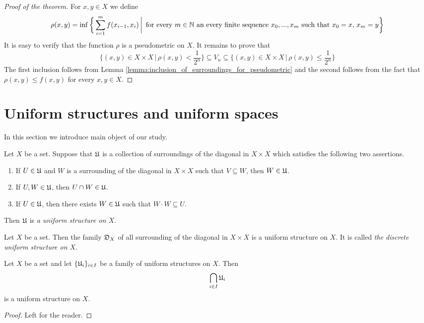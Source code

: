 \begin{proof}[Proof of the theorem]
For $x,y\in X$ we define
$$\rho(x,y) = \inf \bigg\{\sum_{i=1}^mf(x_{i-1},x_i)\,\bigg|\,\mbox{ for every }m\in {\mathbb N}\mbox{ an every finite sequence }x_0,...,x_m\mbox{ such that }x_0 = x,\,x_m = y\bigg\}$$
It is easy to verify that the function $\rho$ is a pseudometric on $X$. It remains to prove that
$$\bigg\{(x,y)\in X\times X\,\bigg|\,\rho(x,y)<\frac{1}{2^n}\bigg\} \subseteq V_n \subseteq \bigg\{(x,y)\in X\times X\,\bigg|\,\rho(x,y) \leq \frac{1}{2^n}\bigg\}$$
The first inclusion follows from Lemma \ref{lemma:inclusion_of_surroundings_for_pseudometric} and the second follows from the fact that $\rho(x,y) \leq f(x,y)$ for every $x,y\in X$.
\end{proof}

\section{Uniform structures and uniform spaces}
\noindent
In this section we introduce main object of our study.

\begin{definition}
Let $X$ be a set. Suppose that ${\mathfrak U}$ is a collection of surroundings of the diagonal in $X\times X$ which satisfies the following two assertions.
\begin{enumerate}[label=\textbf{(\arabic*)}, leftmargin=*]
\item If $U \in {\mathfrak U}$ and $W$ is a surrounding of the diagonal in $X\times X$ such that $V\subseteq W$, then $W\in {\mathfrak U}$.
\item If $U,W\in {\mathfrak U}$, then $U\cap W \in {\mathfrak U}$. 
\item If $U \in {\mathfrak U}$, then there exists $W\in {\mathfrak U}$ such that $W\cdot W \subseteq U$.
\end{enumerate}
Then ${\mathfrak U}$ is \textit{a uniform structure on $X$}.
\end{definition}

\begin{example}\label{example:discrete_uniform_structure}
Let $X$ be a set. Then the family ${\mathfrak D}_X$ of all surrounding of the diagonal in $X\times X$ is a uniform structure on $X$. It is called \textit{the discrete uniform structure on $X$}.
\end{example}

\begin{fact}\label{fact:uniform_structures_are_closed_under_intersections}
Let $X$ be a set and let $\{{\mathfrak U}_i\}_{i\in I}$ be a family of uniform structures on $X$. Then 
$$\bigcap_{i\in I}{\mathfrak U}_i$$
is a uniform structure on $X$.
\end{fact}
\begin{proof}
Left for the reader.
\end{proof}


